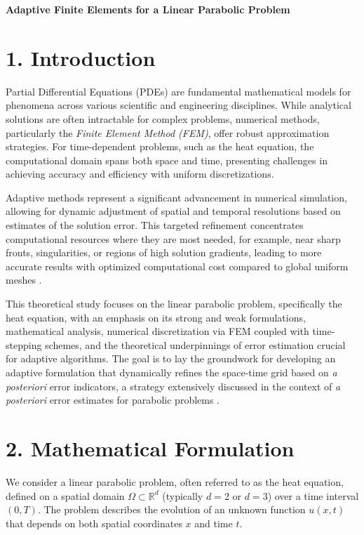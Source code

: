 \documentclass[
  11pt,
]{article}
\author{}
\date{}
\begin{document}
\begin{center}
    \LARGE\bfseries Adaptive Finite Elements for a Linear Parabolic Problem
\end{center}
\vspace{2em}

\section{1. Introduction}

Partial Differential Equations (PDEs) are fundamental mathematical
models for phenomena across various scientific and engineering
disciplines. While analytical solutions are often intractable for
complex problems, numerical methods, particularly the \textit{Finite Element
Method (FEM)}, offer robust approximation strategies. For time-dependent
problems, such as the heat equation, the computational domain spans both
space and time, presenting challenges in achieving accuracy and
efficiency with uniform discretizations.

Adaptive methods represent a significant advancement in numerical
simulation, allowing for dynamic adjustment of spatial and temporal
resolutions based on estimates of the solution error. This targeted
refinement concentrates computational resources where they are most
needed, for example, near sharp fronts, singularities, or regions of
high solution gradients, leading to more accurate results with optimized
computational cost compared to global uniform meshes \cite{picasso1998}.

This theoretical study focuses on the linear parabolic problem,
specifically the heat equation, with an emphasis on its strong and weak
formulations, mathematical analysis, numerical discretization via FEM
coupled with time-stepping schemes, and the theoretical underpinnings of
error estimation crucial for adaptive algorithms. The goal is to lay the
groundwork for developing an adaptive formulation that dynamically refines
the space-time grid based on \textit{a posteriori} error indicators, a strategy extensively
discussed in the context of \textit{a posteriori} error estimates for parabolic
problems \cite{picasso1998}.

\section{2. Mathematical Formulation}

We consider a linear parabolic problem, often referred to as the heat
equation, defined on a spatial domain $\Omega \subset \mathbb{R}^d$
(typically $d=2$ or $d=3$) over a time interval $(0, T)$. The
problem describes the evolution of an unknown function $u(x, t)$ that
depends on both spatial coordinates $x$ and time $t$.
\end{document}

